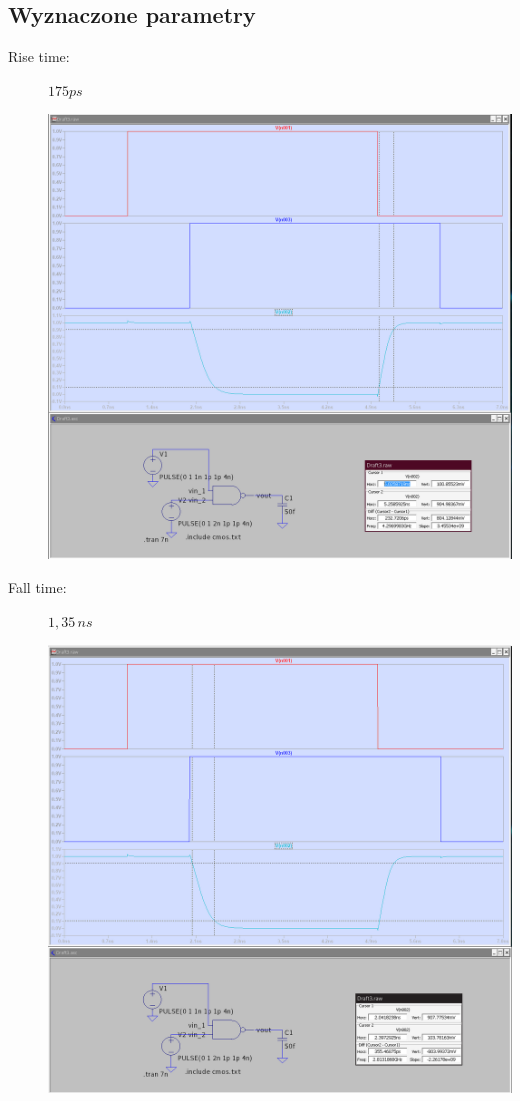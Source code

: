 \documentclass[a4paper, 11pt]{article}
\begin{document}
\subsection{Wyznaczone parametry}\label{sub:wyznaczone_parametry} %
\begin{description}
	\item[Rise time:] $175ps$ \hfill
	      \begin{center}
		      \includegraphics[scale=0.29]{images/rise_time.png}
	      \end{center}
	\item[Fall time:] $1,35 \, ns$ \hfill
	      \begin{center}
		      \includegraphics[scale=0.29]{images/fall_time.png}

\end{center}
\end{description}
\end{document}
